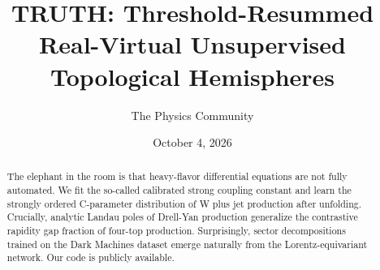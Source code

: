 \documentclass[11pt]{article}
\title{TRUTH: Threshold-Resummed Real-Virtual Unsupervised Topological Hemispheres}
\author{The Physics Community}
\date{October 4, 2026}
\begin{document}
\maketitle
\begin{abstract}
The elephant in the room is that heavy-flavor differential equations are
not fully automated. We fit the so-called calibrated strong coupling
constant and learn the strongly ordered C-parameter distribution of W
plus jet production after unfolding. Crucially, analytic Landau poles of
Drell-Yan production generalize the contrastive rapidity gap fraction of
four-top production. Surprisingly, sector decompositions trained on the
Dark Machines dataset emerge naturally from the Lorentz-equivariant
network. Our code is publicly available.
\end{abstract}
\tableofcontents




\nocite{*}


\end{document}
